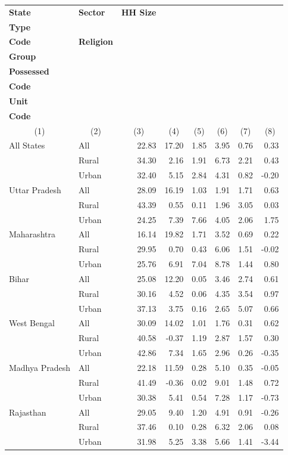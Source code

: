 \label{tab:Table 11}
\begin{tabular}{llrrrrrr}
\toprule
\textbf{State} & \textbf{Sector} & \textbf{HH Size} & \makecell{\textbf{HH}\\ \textbf{Type}\\ \textbf{Code}} & \textbf{Religion} &\makecell{\textbf{Social}\\ \textbf{Group}} & \makecell{\textbf{Land}\\ \textbf{Possessed}\\ \textbf{Code}} & \makecell{\textbf{Dwelling}\\ \textbf{Unit}\\ \textbf{Code}}\\
\multicolumn{1}{c}{(1)} & \multicolumn{1}{c}{(2)} & \multicolumn{1}{c}{(3)} & \multicolumn{1}{c}{(4)} & \multicolumn{1}{c}{(5)} & \multicolumn{1}{c}{(6)} & \multicolumn{1}{c}{(7)} & \multicolumn{1}{c}{(8)} \\
\midrule
All States & All & 22.83 & 17.20 & 1.85 & 3.95 & 0.76 & 0.33\\
 & Rural & 34.30 & 2.16 & 1.91 & 6.73 & 2.21 & 0.43\\
 & Urban & 32.40 & 5.15 & 2.84 & 4.31 & 0.82 & -0.20\\
\addlinespace
Uttar Pradesh & All & 28.09 & 16.19 & 1.03 & 1.91 & 1.71 & 0.63\\
 & Rural & 43.39 & 0.55 & 0.11 & 1.96 & 3.05 & 0.03\\
 & Urban & 24.25 & 7.39 & 7.66 & 4.05 & 2.06 & 1.75\\
\addlinespace
Maharashtra & All & 16.14 & 19.82 & 1.71 & 3.52 & 0.69 & 0.22\\
 & Rural & 29.95 & 0.70 & 0.43 & 6.06 & 1.51 & -0.02\\
 & Urban & 25.76 & 6.91 & 7.04 & 8.78 & 1.44 & 0.80\\
\addlinespace
Bihar & All & 25.08 & 12.20 & 0.05 & 3.46 & 2.74 & 0.61\\
 & Rural & 30.16 & 4.52 & 0.06 & 4.35 & 3.54 & 0.97\\
 & Urban & 37.13 & 3.75 & 0.16 & 2.65 & 5.07 & 0.66\\
\addlinespace
West Bengal & All & 30.09 & 14.02 & 1.01 & 1.76 & 0.31 & 0.62\\
 & Rural & 40.58 & -0.37 & 1.19 & 2.87 & 1.57 & 0.30\\
 & Urban & 42.86 & 7.34 & 1.65 & 2.96 & 0.26 & -0.35\\
\addlinespace
Madhya Pradesh & All & 22.18 & 11.59 & 0.28 & 5.10 & 0.35 & -0.05\\
 & Rural & 41.49 & -0.36 & 0.02 & 9.01 & 1.48 & 0.72\\
 & Urban & 30.38 & 5.41 & 0.54 & 7.28 & 1.17 & -0.73\\
\addlinespace
Rajasthan & All & 29.05 & 9.40 & 1.20 & 4.91 & 0.91 & -0.26\\
 & Rural & 37.46 & 0.10 & 0.28 & 6.32 & 2.06 & 0.08\\
 & Urban & 31.98 & 5.25 & 3.38 & 5.66 & 1.41 & -3.44\\
\bottomrule
\end{tabular}
